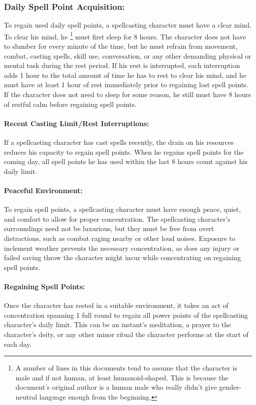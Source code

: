 \subsubsection{Daily Spell Point Acquisition:}
\label{sec:DailySpellPointAcquisition}
To regain used daily spell points, a spellcasting character must have a clear mind. 
To clear his mind, he \footnote{A number of lines in this documents tend to assume that the character is male and if not human, at least humanoid-shaped.
This is because the document's original author is a human male who really didn't give gender-neutral language enough from the beginning.} must first sleep for 8 hours.
The character does not have to slumber for every minute of the time, but he must refrain from movement, combat, casting spells, skill use, conversation, or any other demanding physical or mental task during the rest period. 
If his rest is interrupted, each interruption adds 1 hour to the total amount of time he has to rest to clear his mind, and he must have at least 1 hour of rest immediately prior to regaining lost spell points. 
If the character does not need to sleep for some reason, he still must have 8 hours of restful calm before regaining spell points.

\paragraph{Recent Casting Limit/Rest Interruptions:} If a spellcasting character has cast spells recently, the drain on his resources reduces his capacity to regain spell points. 
When he regains spell points for the coming day, all spell points he has used within the last 8 hours count against his daily limit.

\paragraph{Peaceful Environment:} To regain spell points, a spellcasting character must have enough peace, quiet, and comfort to allow for proper concentration. 
The spellcasting character's surroundings need not be luxurious, but they must be free from overt distractions, such as combat raging nearby or other loud noises. 
Exposure to inclement weather prevents the necessary concentration, as does any injury or failed saving throw the character might incur while concentrating on regaining spell points.

\paragraph{Regaining Spell Points:} Once the character has rested in a suitable environment, it takes an act of concentration spanning 1 full round to regain all power points of the spellcasting character's daily limit. 
This can be an instant's meditation, a prayer to the character's deity, or any other minor ritual the character performs at the start of each day.

